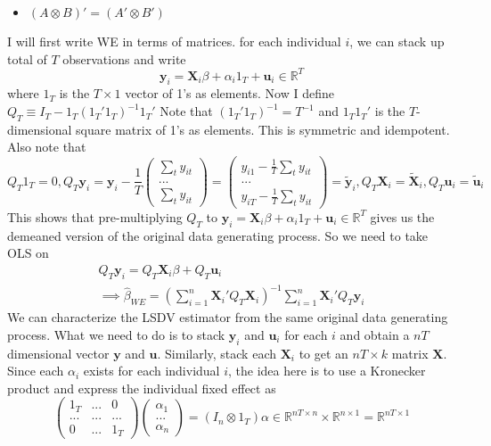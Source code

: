 \begin{itemize}
\begin{mdframed}[backgroundcolor=blue!5]
\begin{definition}
\begin{itemize}
\item $(A\otimes B)'= (A'\otimes B')$
\end{itemize}
\end{definition}
\end{mdframed}\par
I will first write WE in terms of matrices. for each individual $i$, we can stack up total of $T$ observations and write
\[
\mathbf{y}_i =\mathbf{X}_i\beta + \alpha_i 1_T +\mathbf{u}_i \in \mathbb{R}^T 
\]
where $1_T$ is the $T\times 1$ vector of 1's as elements. Now I define $Q_T\equiv I_T-1_T(1_T'1_T)^{-1}1_T'$ Note that $(1_T'1_T)^{-1}=T^{-1}$ and $1_T1_T'$ is the $T$-dimensional square matrix of 1's as elements. This is symmetric and idempotent. Also note that 
\[
Q_T1_T =0, Q_T\mathbf{y}_i=\mathbf{y}_i-\frac{1}{T}\begin{pmatrix}\sum_t y_{it}\\ ...\\\sum_t y_{it}\end{pmatrix}=\begin{pmatrix}y_{i1}-\frac{1}{T}\sum_t y_{it}\\ ... \\y_{iT}-\frac{1}{T}\sum_t y_{it}\end{pmatrix}=\mathbf{\tilde{y}}_i, Q_T\mathbf{X}_i = \mathbf{\tilde{X}}_i,Q_T\mathbf{u}_i = \mathbf{\tilde{u}}_i
\]
This shows that pre-multiplying $Q_T$ to $\mathbf{y}_i =\mathbf{X}_i\beta + \alpha_i 1_T +\mathbf{u}_i \in \mathbb{R}^T $ gives us the demeaned version of the original data generating process. So we need to take OLS on
\begin{gather*}
Q_T\mathbf{y}_i=Q_T\mathbf{X}_i\beta+ Q_T\mathbf{u}_i\\
\implies \hat{\beta}_{WE}=\left(\sum_{i=1}^n\mathbf{X}_i'Q_T\mathbf{X}_i\right)^{-1}\sum_{i=1}^n\mathbf{X}_i'Q_T\mathbf{y}_i
\end{gather*}
We can characterize the LSDV estimator from the same original data generating process. What we need to do is to stack $\mathbf{y}_i$ and $\mathbf{u}_i$  for each $i$ and obtain a $nT$ dimensional vector $\mathbf{y}$ and $\mathbf{u}$. Similarly, stack each $\mathbf{X}_i$ to get an $nT\times k$ matrix $\mathbf{X}$. Since each $\alpha_i$ exists for each individual $i$, the idea here is to use a Kronecker product and express the individual fixed effect as
\[
\begin{pmatrix}1_T &...& 0 \\ ... &...&...\\ 0&...& 1_T \end{pmatrix}\begin{pmatrix}\alpha_1\\ ...\\ \alpha_n \end{pmatrix}=(I_n\otimes 1_T)\alpha\in\mathbb{R}^{nT\times n}\times \mathbb{R}^{n\times 1}=\mathbb{R}^{nT\times 1}
\]
\end{itemize}

